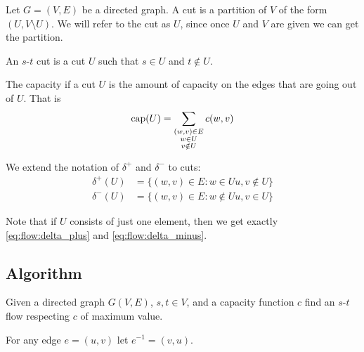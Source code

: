 \documentclass[12pt]{extarticle}
\begin{document}
\begin{definition}[cut]
    Let $G = (V, E)$ be a directed graph.
    A cut is a partition of $V$ of the form $(U, V \setminus U)$.
    We will refer to the cut as $U$, since once $U$ and $V$ are given we can get the partition.
\end{definition}

\begin{definition}[$s$-$t$ cut]
    An $s$-$t$ cut is a cut $U$ such that $s \in U$ and $t \notin U$.
\end{definition}

\begin{definition}
    The capacity if a cut $U$ is the amount of capacity on the edges that are going out of $U$.
    That is
    \begin{equation}
        {\operatorfont cap}(U) = \sum_{\substack{(w, v) \in E \\ w \in U \\ v \notin U}} c(w, v)
    \end{equation}
\end{definition}

\begin{remark}
    We extend the notation of $\delta^+$ and $\delta^-$ to cuts:
    \begin{align}
        \delta^+(U) & = \{(w, v) \in E : w \in U u, v \notin U\} \\
        \delta^-(U) & = \{(w, v) \in E : w \notin U u, v \in U\}
    \end{align}

    Note that if $U$ consists of just one element, then we get exactly \autoref{eq:flow:delta_plus} and \autoref{eq:flow:delta_minus}.
\end{remark}

\subsection{Algorithm}

\begin{definition}
    Given a directed graph $G(V, E)$, $s, t \in V$, and a capacity function $c$ find an $s$-$t$ flow respecting $c$ of maximum value.
\end{definition}

\begin{definition}
    For any edge $e = (u,v)$ let $e^{-1} = (v,u)$.
\end{definition}
\end{document}
